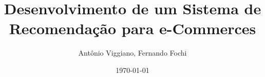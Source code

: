 
\title[Sistema de Recomendação]{\rmfamily Desenvolvimento de um Sistema de Recomendação para e-Commerces} 


\author{Antônio Viggiano, Fernando Fochi} %
\date{\today} %



\begin{frame}
\titlepage %
\end{frame}

